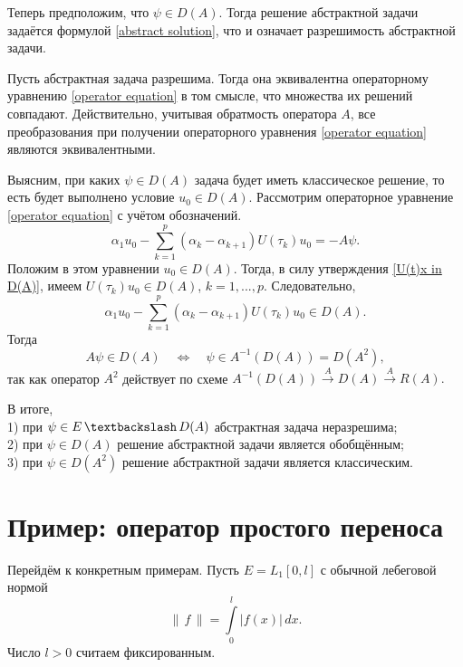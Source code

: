 \documentclass{article}
\theoremstyle{definition}
\begin{document}
Теперь предположим, что $\psi \in D(A)$. Тогда решение абстрактной задачи задаётся формулой \eqref{abstract solution}, 
что и означает разрешимость абстрактной задачи.

Пусть абстрактная задача разрешима. Тогда она эквивалентна операторному уравнению \eqref{operator equation} в том смысле, 
что множества их решений совпадают. Действительно, учитывая обратмость оператора $A$,
все преобразования при получении операторного уравнения \eqref{operator equation} являются
эквивалентными. 

Выясним, при каких $ \psi \in D(A) $ задача будет иметь классическое решение, то есть будет выполнено условие $ u_0 \in D(A) $.
Рассмотрим операторное уравнение \eqref{operator equation} с учётом обозначений.
\begin{equation*}
	\alpha_1 u_0 - \sum\limits_{k = 1}^{p} (\alpha_k - \alpha_{k + 1})U(\tau_k)u_0 = -A\psi.
\end{equation*}
Положим в этом уравнении $u_0 \in D(A)$. 
Тогда, в силу утверждения \ref{U(t)x in D(A)}, имеем \linebreak $U(\tau_k)u_0 \in D(A)$, $k = 1,..., p$. 
Следовательно, 
\begin{equation*}
	\alpha_1 u_0 - \sum\limits_{k = 1}^{p} (\alpha_k - \alpha_{k + 1})U(\tau_k)u_0 \in D(A).
\end{equation*}
Тогда
\begin{equation*}
	A\psi \in D(A) \quad \Longleftrightarrow \quad \psi \in A^{-1}(D(A)) = D(A^2),
\end{equation*}
так как оператор $A^2$ действует по схеме $ A^{-1}(D(A)) \xrightarrow{A} D(A) \xrightarrow{A} R(A). $

В итоге, \\
1) при $ \psi \in E \, \textbackslash \, D(A) $ абстрактная задача неразрешима; \\
2) при $ \psi \in D(A) $ решение абстрактной задачи является обобщённым; \\
3) при $ \psi \in D(A^2) $ решение абстрактной задачи является классическим.

\newpage

\section{Пример: оператор простого переноса}
Перейдём к конкретным примерам. Пусть $E = L_1[0,l]$ с обычной лебеговой нормой
\begin{equation} \label{norm}
	\|\, f \,\| = \int\limits_0^l | f(x) | \,dx.
\end{equation}
Число $l > 0$ считаем фиксированным.
\end{document}
